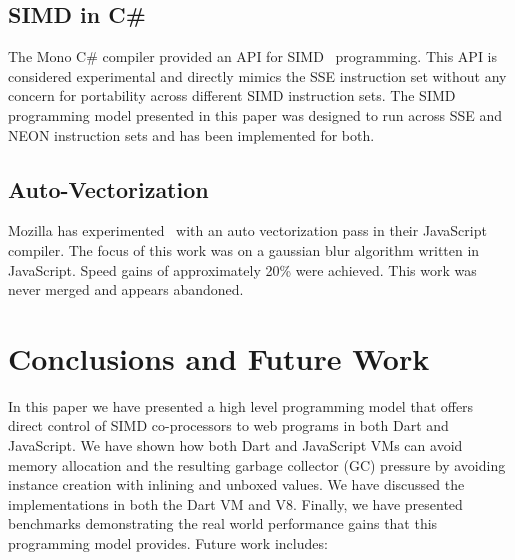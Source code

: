 \documentclass[preprint]{sigplanconf}
\begin{document}
\subsection{SIMD in C\#}

The Mono C\# compiler provided an API for SIMD~\cite{monosimd} programming. This
API is considered experimental and directly mimics the SSE instruction set
without any concern for portability across different SIMD instruction sets. The
SIMD programming model presented in this paper was designed to run across SSE
and NEON instruction sets and has been implemented for both.

\subsection{Auto-Vectorization}

Mozilla has experimented~\cite{mozillasimd} with an auto vectorization pass in
their JavaScript compiler. The focus of this work was on a gaussian blur
algorithm written in JavaScript. Speed gains of approximately 20\% were
achieved. This work was never merged and appears abandoned.

\section{Conclusions and Future Work}

In this paper we have presented a high level programming model that offers
direct control of SIMD co-processors to web programs in both Dart and
JavaScript. We have shown how both Dart and JavaScript VMs can avoid memory
allocation and the resulting garbage collector (GC) pressure by avoiding
instance creation with inlining and unboxed values. We have discussed the
implementations in both the Dart VM and V8. Finally, we have presented
benchmarks demonstrating the real world performance gains that this programming
model provides. Future work includes:
\end{document}

